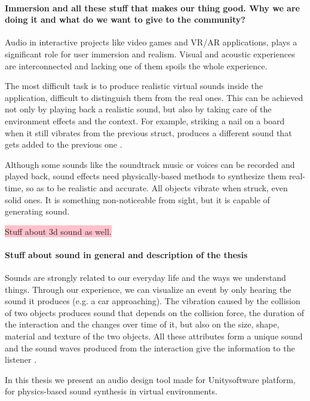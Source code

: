 \paragraph{Immersion and all these stuff that makes our thing good. Why we are doing it and what do we want to give to the community?\\}

Audio in interactive projects like video games and VR/AR applications, plays a significant role for user immersion and realism. Visual and acoustic experiences are interconnected and lacking one of them spoils the whole experience. 

The most difficult task is to produce realistic virtual sounds inside the application, difficult to distinguish them from the real ones. This can be achieved not only by playing back a realistic sound, but also by taking care of the environment effects and the context. For example, striking a nail on a board when it still vibrates from the previous struct, produces a different sound that gets added to the previous one \cite{Cook:2002:RSS:515316}.

Although some sounds like the soundtrack music or voices can be recorded and played back, sound effects need physically-based methods to synthesize them real-time, so as to be realistic and accurate. All objects vibrate when struck, even solid ones. It is something non-noticeable from sight, but it is capable of generating sound.  

\colorbox{pink}{Stuff about 3d sound as well.}

\paragraph{Stuff about sound in general and description of the thesis\\}

Sounds are strongly related to our everyday life and the ways we understand things. Through our experience, we can visualize an event by only hearing the sound it produces (e.g. a car approaching). The vibration caused by the collision of two objects produces sound that depends on the collision force, the duration of the interaction  and the changes over time of it, but also on the size, shape, material and texture of the two objects. All these attributes form a unique sound and the sound waves produced from the interaction give the information to the listener \cite{gaver1993world}.

In this thesis we present an audio design tool made for Unity\textregistered software platform, for physics-based sound synthesis in virtual environments. \\


